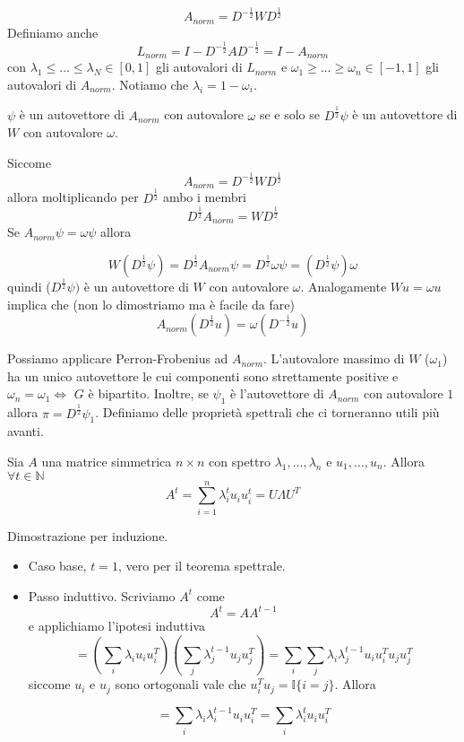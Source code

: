 \documentclass[12pt]{report}
\begin{document}
$$A_{norm} = D^{-\frac{1}{2}} W D^{\frac{1}{2}}$$
Definiamo anche 
$$L_{norm} = I - D^{-\frac{1}{2}} A D^{-\frac{1}{2}} = I - A_{norm}$$
con $\lambda_1 \leq \dots \leq \lambda_N \in [0,1]$ gli autovalori di $L_{norm}$ e $\omega_1\geq \dots \geq \omega_n \in [-1,1]$ gli autovalori di $A_{norm}$. Notiamo che $\lambda_i = 1 - \omega_i$.

\begin{fatto}
    $\psi$ è un autovettore di $A_{norm}$ con autovalore $\omega$ se e solo se $D^{\frac{1}{2}} \psi$ è un autovettore di $W$ con autovalore $\omega$.
\end{fatto}

\begin{dimo}Siccome
    $$A_{norm} = D^{-\frac{1}{2}} W D^{\frac{1}{2}}$$
    allora moltiplicando per $D^{\frac{1}{2}}$ ambo i membri
    $$ D^{\frac{1}{2}} A_{norm} = W D^{\frac{1}{2}}$$
    Se $A_{norm} \psi = \omega \psi$ allora

    $$W(D^{\frac{1}{2}}\psi) = D^{\frac{1}{2}} A_{norm}\psi = D^{\frac{1}{2}}\omega\psi = (D^{\frac{1}{2}}\psi)\omega$$
    quindi ($D^{\frac{1}{2}}\psi)$ è un autovettore di $W$ con autovalore $\omega$. Analogamente $W u = \omega u$ implica che (non lo dimostriamo ma è facile da fare) $$A_{norm} (D^{\frac{1}{2}} u) = \omega(D^{-\frac{1}{2}} u)$$
\end{dimo}

\vspace{20px}
\noindent
Possiamo applicare Perron-Frobenius ad $A_{norm}$. L'autovalore massimo di $W$ ($\omega_1$) ha un unico autovettore le cui componenti sono strettamente positive e $\omega_n = \omega_1 \Leftrightarrow$ $G$ è bipartito. Inoltre, se $\psi_1$ è l'autovettore di $A_{norm}$ con autovalore $1$ allora $\pi = D^{\frac{1}{2}} \psi_1$. 
Definiamo delle proprietà spettrali che ci torneranno utili più avanti.

\begin{fatto}
    Sia $A$ una matrice simmetrica $n \times n$ con spettro $\lambda_1,\dots,\lambda_n$ e $u_1,\dots,u_n$. Allora $\forall t \in \mathds{N}$ 
    $$A^t = \sum_{i=1}^n \lambda_i^t u_i u_i^t = U \Lambda U^T$$ 
\end{fatto}
\begin{dimo}
    Dimostrazione per induzione. 
    \begin{itemize}
        \item Caso base, $t = 1$, vero per il teorema spettrale.
        \item Passo induttivo. Scriviamo $A^t$ come
        $$A^t = A A^{t-1}$$
        e applichiamo l'ipotesi induttiva
        $$= (\sum_i \lambda_i u_i u_i^T) (\sum_j \lambda_j^{t-1} u_j u_j^T) = \sum_i \sum_j \lambda_i \lambda_j^{t-1} u_i u_i^T u_j u_j^T$$
        siccome $u_i$ e $u_j$ sono ortogonali vale che $u_i^T u_j = \mathds{I}\{i = j\}$. Allora 

        $$= \sum_i \lambda_i \lambda_i^{t-1} u_i u_i^T = \sum_i \lambda_i^t u_i u_i^T$$
    \end{itemize}
\end{dimo}
\end{document}
